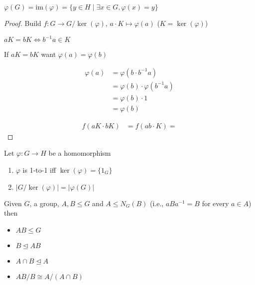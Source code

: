 \begin{definition}
  $\varphi(G) = \text{im}(\varphi) = \{y \in H \mid \exists x \in G, \varphi(x) = y\}$
\end{definition}
\begin{proof}
  Build $f: G \to G/\ker(\varphi)$, $a\cdot K \mapsto \varphi(a)$ ($K = \ker(\varphi)$)

  $aK = bK \iff b^{-1}a \in K$

  If $aK = bK$ want $\varphi(a) = \varphi(b)$

  \begin{align*}
    \varphi(a) &= \varphi(b \cdot b^{-1}a) \\
    &= \varphi(b) \cdot \varphi(b^{-1}a) \\
    &= \varphi(b) \cdot 1 \\
    &= \varphi(b)
  \end{align*}

  \begin{align*}
    f(aK \cdot bK) &= f(ab \cdot K) = 
  \end{align*}

\end{proof}

\begin{corollary}
  Let $\varphi: G \to H$ be a homomorphism
  \begin{enumerate}
    \item $\varphi$ is 1-to-1 iff $\ker(\varphi) = \{1_G\}$
    \item $|G/\ker(\varphi)| = |\varphi(G)|$
  \end{enumerate}
\end{corollary}

\begin{theorem}
  Given $G$, a group, $A, B \le G$ and $A \le N_G(B)$
  (i.e., $aBa^{-1} = B$ for every $a \in A$)
  then 
  \begin{itemize}
    \item $AB \le G$ 
    \item $B \unlhd AB$ 
    \item $A \cap B \unlhd A$
    \item $AB/B \cong A / (A \cap B)$
  \end{itemize}
\end{theorem}

